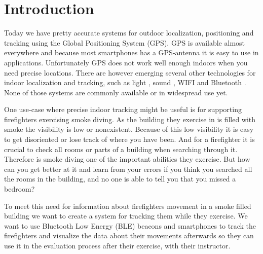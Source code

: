 \documentclass[../Main/thesis.tex]{subfiles}
\begin{document}
\chapter{Introduction}
\label{ch:introduction}


Today we have pretty accurate systems for outdoor localization, positioning and tracking using the Global Positioning System (GPS). 
GPS is available almost everywhere and because most smartphones has a GPS-antenna it is easy to use in applications.
Unfortunately GPS does not work well enough indoors when you need precise locations.
There are however emerging several other technologies for indoor localization and tracking, such as light \citep{xiaohan2010improved}, sound \citep{schweinzer2010ultrasonic}, WIFI  \citep{chang2010robust} and Bluetooth \citep{Takahashi2016}.
None of those systems are commonly available or in widespread use yet.

One use-case where precise indoor tracking might be useful is for supporting firefighters exercising smoke diving. 
As the building they exercise in is filled with smoke the visibility is low or nonexistent.
Because of this low visibility it is easy to get disoriented or lose track of where you have been.
And for a firefighter it is crucial to check all rooms or parts of a building when searching through it.
Therefore is smoke diving one of the important abilities they exercise.
But how can you get better at it and learn from your errors if you think you searched all the rooms in the building, and no one is able to tell you that you missed a bedroom?

To meet this need for information about firefighters movement in a smoke filled building we want to create a system for tracking them while they exercise.
We want to use Bluetooth Low Energy (BLE) beacons and smartphones to track the firefighters and visualize the data about their movements afterwards so they can use it in the evaluation process after their exercise, with their instructor.
\end{document}

